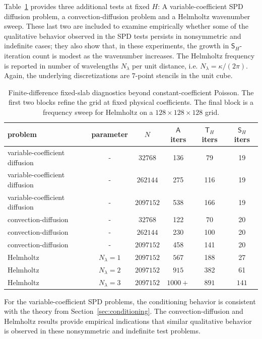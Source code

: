 \documentclass[final,onefignum,onetabnum]{siamart250211}
\newcommand{\mtx}[1]{\bm{\mathsf{#1}}}
\theoremstyle{definition}
\begin{document}
Table~\ref{tab:fd_other_models} provides three additional tests at fixed $H$: A variable-coefficient SPD diffusion problem, a convection-diffusion problem and a Helmholtz wavenumber sweep. 
These last two are included to examine empirically whether some of the qualitative behavior observed in the SPD tests persists in nonsymmetric and indefinite cases; they also show that, in these experiments, the growth in $\mtx{S}_{H}$-iteration count is modest as the wavenumber increases.
The Helmholtz frequency is reported in number of wavelengths $N_{\lambda}$ per unit distance, i.e. $N_{\lambda} = \kappa/(2\pi)$. Again, the underlying discretizations are $7$-point stencils in the unit cube.
\begin{table}[H]
\centering
\begin{tabular}{l|c|c|ccc}
problem & parameter & $N$ & $\mtx{A}$ iters & $\mtx{T}_H$ iters & $\mtx{S}_H$ iters\\
\hline
variable-coefficient diffusion & - & $32768$ & 136 & 79 & 19\\
variable-coefficient diffusion & - & $262144$ & 275 & 116 & 19\\
variable-coefficient diffusion & - & $2097152$ & 538 & 166 & 19\\
\hline
convection-diffusion & - & $32768$ & 122 & 70 & 20\\
convection-diffusion & - & $262144$ & 230 & 100 & 20\\
convection-diffusion & - & $2097152$ & 458 & 141 & 20\\
\hline
Helmholtz & $N_{\lambda} = 1$ & $2097152$ & $567$ & 188 & 27\\
Helmholtz & $N_{\lambda} = 2$ & $2097152$ & $915$ & 382 & 61\\
Helmholtz & $N_{\lambda} = 3$ & $2097152$ & $1000+$ & $891$ & $141$\\
\end{tabular}
\caption{Finite-difference fixed-slab diagnostics beyond constant-coefficient Poisson.  The first two blocks refine the grid at fixed physical coefficients.  The final block is a frequency sweep for Helmholtz on a $128\times 128 \times 128$ grid.}
\label{tab:fd_other_models}
\end{table}

For the variable-coefficient SPD problems, the conditioning behavior is consistent with the theory from Section~\ref{sec:conditioning}. 
The convection-diffusion and Helmholtz results provide empirical indications that similar qualitative behavior is observed in these nonsymmetric and indefinite test problems.
\end{document}
